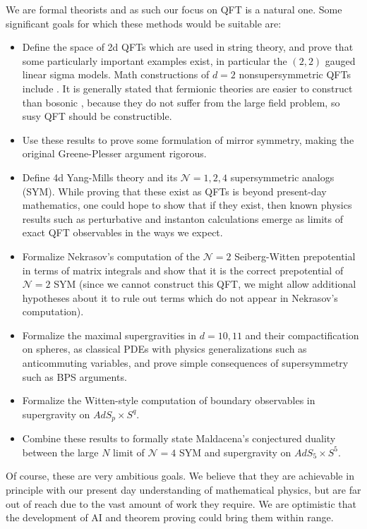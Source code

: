 \documentclass{article}
\newcommand{\cN}{\mathcal N}
\begin{document}
We are formal theorists and as such our focus on QFT is a natural one.  Some significant goals 
for which these methods would be suitable are:
\begin{itemize}
    \item Define the space of 2d QFTs which are used in string theory, and prove that some particularly important examples exist, in particular the $(2,2)$ gauged linear sigma models.  Math constructions of $d=2$ nonsupersymmetric QFTs include \cite{}.  It is generally stated that fermionic theories are easier to construct than bosonic \cite{},
    because they do not suffer from the large field problem, so susy QFT should be constructible.
    \item Use these results to prove some formulation of mirror symmetry, making the original Greene-Plesser argument rigorous.
    \item Define 4d Yang-Mills theory and its $\cN=1,2,4$ supersymmetric analogs (SYM).  While proving that these exist
    as QFTs is beyond present-day mathematics, one could hope to show that if they exist, then known physics results such as perturbative and instanton calculations emerge as limits of exact QFT observables in the ways we expect.
    \item Formalize Nekrasov's computation of the $\cN=2$ Seiberg-Witten prepotential in terms of matrix integrals
    and show that it is the correct prepotential of $\cN=2$ SYM (since we cannot construct this QFT, we might allow additional hypotheses about it to rule out terms which do not appear in Nekrasov's computation).
    \item Formalize the maximal supergravities in $d=10,11$ and their compactification on spheres, as classical PDEs with physics generalizations such as anticommuting variables, and prove simple consequences of supersymmetry such as BPS arguments.
    \item Formalize the Witten-style computation of boundary observables in supergravity on $AdS_p\times S^q$.
    \item Combine these results to formally state Maldacena's conjectured duality between the large $N$
    limit of $\cN=4$ SYM and supergravity on  $AdS_5\times S^5$.
\end{itemize}
Of course, these are very ambitious goals. We believe that they are achievable in principle with our present day understanding of mathematical physics, but are far out of reach due to the vast amount of work they require.
We are optimistic that the development of AI and theorem proving could bring them within range.
\end{document}
